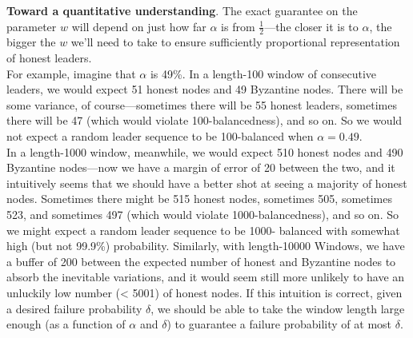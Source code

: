 \noindent\textbf{Toward a quantitative understanding}. The exact guarantee on the parameter $w$ will
depend on just how far $\alpha$ is from $\frac{1}{2}$—the closer it is to $\alpha$, the bigger the $w$ we’ll need to take
to ensure sufficiently proportional representation of honest leaders.\\
For example, imagine that $\alpha$ is 49\%. In a length-100 window of consecutive leaders, we
would expect 51 honest nodes and 49 Byzantine nodes. There will be some variance, of
course—sometimes there will be 55 honest leaders, sometimes there will be 47 (which would
violate 100-balancedness), and so on. So we would not expect a random leader sequence to
be 100-balanced when $\alpha = 0.49$.\\
In a length-1000 window, meanwhile, we would expect 510 honest nodes and 490 Byzantine nodes—now we have a margin of error of 20 between the two, and it intuitively seems
that we should have a better shot at seeing a majority of honest nodes. Sometimes there
might be 515 honest nodes, sometimes 505, sometimes 523, and sometimes 497 (which would violate
1000-balancedness), and so on. So we might expect a random leader sequence to be 1000-
balanced with somewhat high (but not 99.9\%) probability. Similarly, with length-10000
Windows, we have a buffer of 200 between the expected number of honest and Byzantine
nodes to absorb the inevitable variations, and it would seem still more unlikely to have an
unluckily low number (< 5001) of honest nodes. If this intuition is correct, given a desired failure probability $\delta$, we should be able to take the window length large enough (as a function
of $\alpha$ and $\delta$) to guarantee a failure probability of at most $\delta$.

